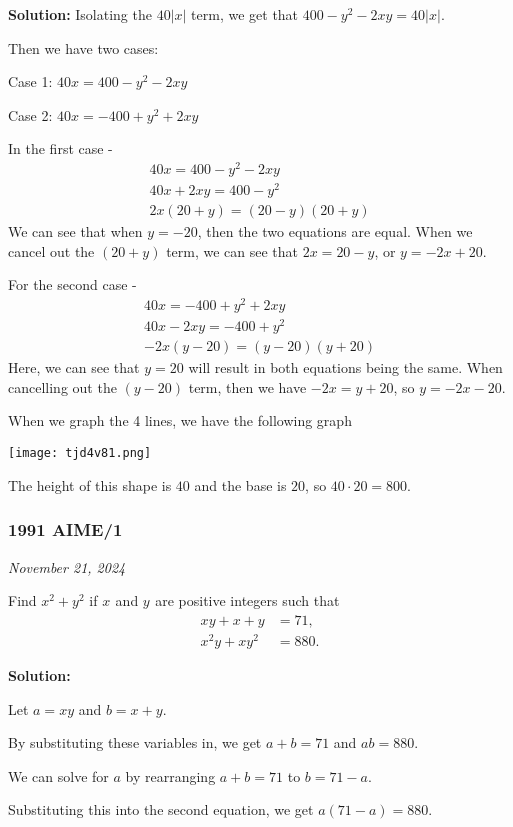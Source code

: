 \documentclass[../mathproblems.tex]{subfiles}
\begin{document}
\textbf{Solution:}
Isolating the $40|x|$ term, we get that $400-y^2-2xy = 40|x|$.

Then we have two cases:

Case 1:
$40x = 400-y^2-2xy$

Case 2:
$40x = -400+y^2+2xy$

In the first case - 
\begin{align*}
40x = 400-y^2-2xy\\
40x+2xy = 400-y^2\\
2x(20+y) = (20-y)(20+y)
\end{align*}
We can see that when $y=-20$, then the two equations are equal. When we cancel out the $(20+y)$ term, we can see that $2x=20-y$, or $y=-2x+20$.

For the second case - 
\begin{align*}
40x = -400+y^2+2xy\\
40x-2xy = -400+y^2\\
-2x(y-20) = (y-20)(y+20)
\end{align*}
Here, we can see that $y=20$ will result in both equations being the same. When cancelling out the $(y-20)$ term, then we have $-2x=y+20$, so $y=-2x-20$.

When we graph the 4 lines, we have the following graph
\begin{center}
    \texttt{[image: tjd4v81.png]}
\end{center}

The height of this shape is $40$ and the base is $20$, so $40\cdot 20 = \boxed{800}$.

\noindent\hrulefill


\subsubsection*{1991 AIME/1} 
\textit{November 21, 2024}

Find $x^2+y^2_{}$ if $x_{}^{}$ and $y_{}^{}$ are positive integers such that \begin{align*} xy+x+y&=71, \\ x^2y+xy^2&=880. \end{align*}

\textbf{Solution:}

Let $a=xy$ and $b=x+y$.

By substituting these variables in, we get $a+b=71$ and $ab = 880$.

We can solve for $a$ by rearranging $a+b = 71$ to $b=71-a$.

Substituting this into the second equation, we get $a(71-a)=880$.
\end{document}
